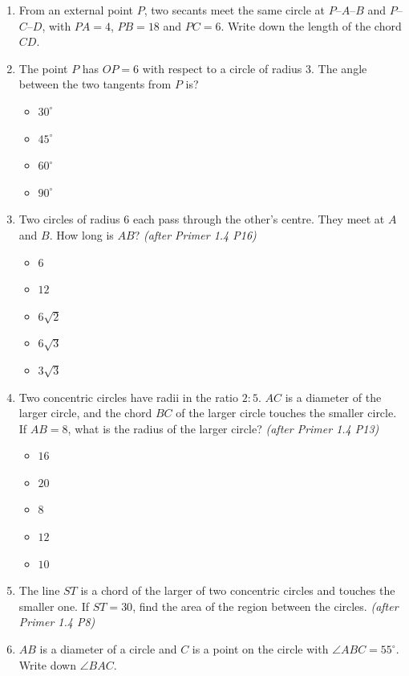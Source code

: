 \documentclass[11pt,a4paper]{article}
\begin{document}
\begin{enumerate}
\item From an external point $P$, two secants meet the same circle at $P$--$A$--$B$ and $P$--$C$--$D$, with $PA=4$, $PB=18$ and $PC=6$. Write down the length of the chord $CD$.

\item The point $P$ has $OP=6$ with respect to a circle of radius $3$. The angle between the two tangents from $P$ is?
\begin{itemize}
\item[A)] $30^\circ$
\item[B)] $45^\circ$
\item[C)] $60^\circ$
\item[D)] $90^\circ$
\end{itemize}

\item Two circles of radius $6$ each pass through the other's centre. They meet at $A$ and $B$. How long is $AB$? \textit{\small(after Primer 1.4 P16)}
\begin{itemize}
\item[A)] $6$
\item[B)] $12$
\item[C)] $6\sqrt2$
\item[D)] $6\sqrt3$
\item[E)] $3\sqrt3$
\end{itemize}

\item Two concentric circles have radii in the ratio $2:5$. $AC$ is a diameter of the larger circle, and the chord $BC$ of the larger circle touches the smaller circle. If $AB=8$, what is the radius of the larger circle? \textit{\small(after Primer 1.4 P13)}
\begin{itemize}
\item[A)] $16$
\item[B)] $20$
\item[C)] $8$
\item[D)] $12$
\item[E)] $10$
\end{itemize}

\item The line $ST$ is a chord of the larger of two concentric circles and touches the smaller one. If $ST=30$, find the area of the region between the circles. \textit{\small(after Primer 1.4 P8)}

\item $AB$ is a diameter of a circle and $C$ is a point on the circle with $\angle ABC=55^\circ$. Write down $\angle BAC$.

\end{enumerate}
\end{document}
